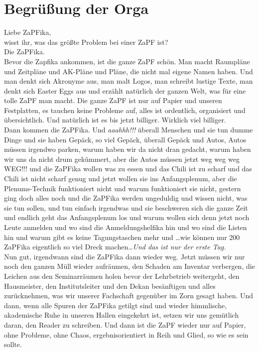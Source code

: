 
\section{Begrüßung der Orga}
Liebe ZaPFika,\\

wisst ihr, was das größte Problem bei einer ZaPF ist?\\

Die ZaPFika.\\

Bevor die Zapfika ankommen, ist die ganze ZaPF schön. Man macht Raumpläne und Zeitpläne und AK-Pläne und Pläne, die nicht mal eigene Namen haben. Und man denkt sich Akronyme aus, man malt Logos, man schreibt lustige Texte, man denkt sich Easter Eggs aus und erzählt natürlich der ganzen Welt, was für eine tolle ZaPF man macht. Die ganze ZaPF ist nur auf Papier und unseren Festplatten, es tauchen keine Probleme auf, alles ist ordentlich, organisiert und übersichtlich. Und natürlich ist es bis jetzt billiger. Wirklich viel billiger.\\

Dann kommen die ZaPFika. Und \textit{aaahhh!!!} überall Menschen und sie tun dumme Dinge und sie haben Gepäck, so viel Gepäck, überall Gepäck und Autos, Autos müssen irgendwo parken, warum haben wir da nicht dran gedacht, warum haben wir uns da nicht drum gekümmert, aber die Autos müssen jetzt weg weg weg WEG!!! und die ZaPFika wollen was zu essen und das Chili ist zu scharf und das Chili ist nicht scharf genug und jetzt wollen sie ins Anfangsplenum, aber die Plenums-Technik funktioniert nicht und warum funktioniert sie nicht, gestern ging doch alles noch und die ZaPFika werden ungeduldig und wissen nicht, was sie tun sollen, und tun einfach irgendwas und sie beschweren sich die ganze Zeit und endlich geht das Anfangsplenum los und warum wollen sich denn jetzt noch Leute anmelden und wo sind die Anmeldungshelfika hin und wo sind die Listen hin und warum gibt es keine Tagungstaschen mehr und \dots wie können nur 200 ZaPFika eigentlich so viel Dreck machen\dots\textit{Und das ist nur der erste Tag.}\\

Nun gut, irgendwann sind die ZaPFika dann wieder weg. Jetzt müssen wir nur noch den ganzen Müll wieder aufräumen, den Schaden am Inventar verbergen, die Leichen aus den Seminarräumen holen bevor der Lehrbetrieb weitergeht, den Hausmeister, den Institutsleiter und den Dekan besänftigen und alles zurücknehmen, was wir unserer Fachschaft gegenüber im Zorn gesagt haben. Und dann, wenn alle Spuren der ZaPFika getilgt sind und wieder himmlische, akademische Ruhe in unseren Hallen eingekehrt ist, setzen wir uns gemütlich daran, den Reader zu schreiben. Und dann ist die ZaPF wieder nur auf Papier, ohne Probleme, ohne Chaos, ergebnisorientiert in Reih und Glied, so wie es sein sollte.\\


